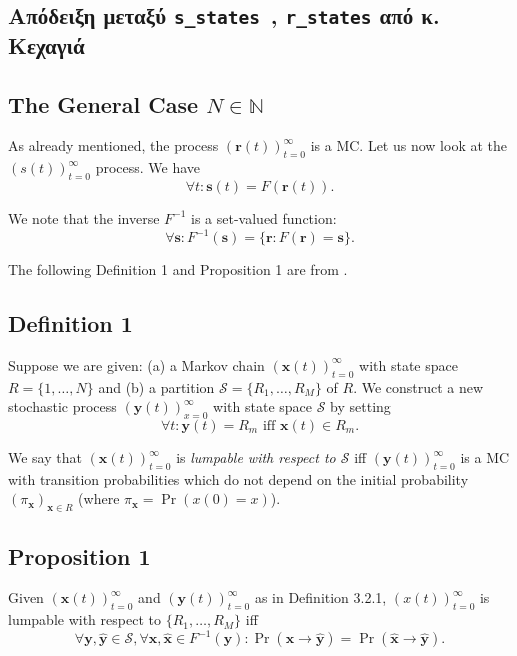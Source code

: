 \begin{appendices}
\renewcommand{\thesection}{Appx. \Alph{section}:}

\section{\\Απόδειξη μεταξύ \texttt{s\_states }, \texttt{r\_states} από κ. Κεχαγιά  }
\subsection*{The General Case \( N \in \mathbb{N} \)}

As already mentioned, the process \((\bm{r}(t))_{t=0}^{\infty}\) is a MC. Let us now look at the \((s(t))_{t=0}^{\infty}\) process. We have  
\[
\forall t : \bm{s}(t) = F(\bm{r}(t)).
\]

We note that the inverse \(F^{-1}\) is a set-valued function:  
\[
\forall\bm{ s} : F^{-1}(\bm{s}) = \{ \bm{r} : F(\bm{r}) = \bm{s} \}.
\]

The following Definition 1 and Proposition 1  are from \cite{kex}.

\subsection*{Definition 1}
Suppose we are given: (a) a Markov chain \((\bm{x}(t))_{t=0}^{\infty}\) with state space \(R = \{ 1, \ldots, N \}\) and (b) a partition \(\mathcal{S} = \{ R_1, \ldots, R_M \}\) of \(R\). We construct a new stochastic process \((\bm{y}(t))_{x=0}^{\infty}\) with state space \(\mathcal{S}\) by setting  
\[
\forall t : \bm{y}(t) = R_m \text{ iff } \bm{x}(t) \in R_m.
\]

We say that \((\bm{x}(t))_{t=0}^{\infty}\) is \emph{lumpable with respect to \(\mathcal S\)} iff \((\bm{y}(t))_{t=0}^{\infty}\) is a MC with transition probabilities which do not depend on the initial probability \((\pi_{\bm{x}})_{\bm{x} \in R}\) (where \(\pi_{\bm{x}} = \Pr(x(0) = x)\)).


\subsection*{Proposition 1}
Given \((\bm{x}(t))_{t=0}^{\infty}\) and \((\bm{y}(t))_{t=0}^{\infty}\) as in Definition 3.2.1, \((x(t))_{t=0}^{\infty}\) is lumpable with respect to \(\{ R_1, \ldots, R_M \}\) iff  
\[
\forall \bm{y}, \hat{\bm{y}} \in \mathcal S, \forall \bm{x}, \hat{\bm{x}} \in F^{-1}(\bm{y}) : \Pr(\bm{x} \rightarrow \hat{\bm{y}}) = \Pr(\hat{\bm{x}} \rightarrow \hat{\bm{y}}).
\]


\end{appendices}
